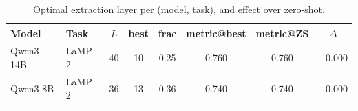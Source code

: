 \begin{table}[t]
\centering\small
\begin{tabular}{llcccccc}
\toprule
Model & Task & $L$ & best & frac & metric@best & metric@ZS & $\Delta$ \\
\midrule
Qwen3-14B & LaMP-2 & 40 & 10 & 0.25 & 0.760 & 0.760 & +0.000 \\
Qwen3-8B & LaMP-2 & 36 & 13 & 0.36 & 0.740 & 0.740 & +0.000 \\
\bottomrule
\end{tabular}
\caption{Optimal extraction layer per (model, task), and effect over zero-shot.}
\label{tab:layer_search}
\end{table}
